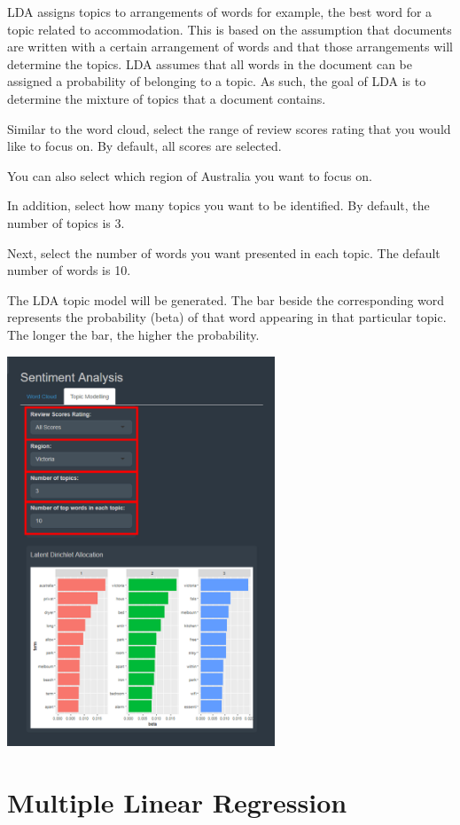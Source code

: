 \documentclass[
]{article}
\begin{document}
LDA assigns topics to arrangements of words for example, the best word
for a topic related to accommodation. This is based on the assumption
that documents are written with a certain arrangement of words and that
those arrangements will determine the topics. LDA assumes that all words
in the document can be assigned a probability of belonging to a topic.
As such, the goal of LDA is to determine the mixture of topics that a
document contains.

Similar to the word cloud, select the range of review scores rating that
you would like to focus on. By default, all scores are selected.

You can also select which region of Australia you want to focus on.

In addition, select how many topics you want to be identified. By
default, the number of topics is 3.

Next, select the number of words you want presented in each topic. The
default number of words is 10.

The LDA topic model will be generated. The bar beside the corresponding
word represents the probability (beta) of that word appearing in that
particular topic. The longer the bar, the higher the probability.

\includegraphics[width=0.6\textwidth,height=\textheight]{images/topicmodel1.png}

\hypertarget{multiple-linear-regression}{%
\section{Multiple Linear Regression}\label{multiple-linear-regression}}
\end{document}
